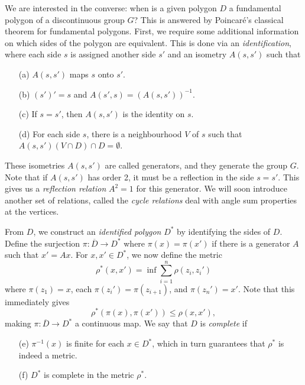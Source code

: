 \documentclass[12pt]{article}
\theoremstyle{definition}
\theoremstyle{remark}
\begin{document}
    We are interested in the converse: when is a given polygon $D$ a fundamental
    polygon of a discontinuous group $G$? This is answered by Poincar\'e's classical
    theorem for fundamental polygons. First, we require some additional information
    on which sides of the polygon are equivalent. This is done via an
    \emph{identification}, where each side $s$ is assigned another side $s'$ and an
    isometry $A(s, s')$ such that \begin{itemize}
        \item[(a)] $A(s, s')$ maps $s$ onto $s'$.
        \item[(b)] $(s')' = s$ and $A(s', s) = (A(s, s'))^{-1}$.
        \item[(c)] If $s = s'$, then $A(s, s')$ is the identity on $s$.
        \item[(d)] For each side $s$, there is a neighbourhood $V$ of $s$ such that
        $A(s, s')(V \cap D) \cap D = \emptyset$.
    \end{itemize}

    These isometries $A(s, s')$ are called generators, and they generate the group
    $G$. Note that if $A(s, s')$ has order 2, it must be a reflection in the side $s
    = s'$. This gives us a \emph{reflection relation} $A^2 = 1$ for this generator.
    We will soon introduce another set of relations, called the \emph{cycle
    relations} deal with angle sum properties at the vertices.

    From $D$, we construct an \emph{identified polygon} $D^*$ by identifying the
    sides of $D$. Define the surjection $\pi\colon \overline{D} \to D^*$ where
    $\pi(x) = \pi(x')$ if there is a generator $A$ such that $x' = Ax$. For $x, x'
    \in D^*$, we now define the metric \[
        \rho^*(x, x') = \inf \sum_{i = 1}^n \rho(z_i, z_i')
    \] where $\pi(z_1) = x$, each $\pi(z_i') = \pi(z_{i + 1})$, and $\pi(z_n') = x'$.
    Note that this immediately gives \[
        \rho^*(\pi(x), \pi(x')) \leq \rho(x, x'),
    \] making $\pi\colon \overline{D} \to D^*$ a continuous map. We say that $D$ is
    \emph{complete} if \begin{itemize}
        \item[(e)] $\pi^{-1}(x)$ is finite for each $x \in D^*$, which in turn
        guarantees that $\rho^*$ is indeed a metric.
        \item[(f)] $D^*$ is complete in the metric $\rho^*$.
    \end{itemize}
\end{document}
